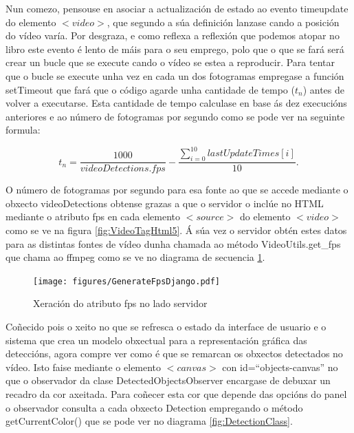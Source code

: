         Nun comezo, pensouse en asociar a actualización de estado ao evento timeupdate do elemento 
        $<video>$, que segundo a súa definición lanzase cando a posición do vídeo varía. Por desgraza, 
        e como reflexa a reflexión que podemos atopar no libro \cite[Capítulo 6.1]{video-con-html5}
        este evento é lento de máis para o seu emprego, polo que o que se fará será
        crear un bucle que se execute cando o vídeo se estea a reproducir. Para tentar que o bucle se 
        execute unha vez en cada un dos fotogramas empregase a función setTimeout que fará que o 
        código agarde unha cantidade de tempo ($t_n$) antes de volver a executarse. Esta cantidade de tempo 
        calculase en base ás dez execucións anteriores e ao número de fotogramas por segundo como se
        pode ver na seguinte formula:
        
        \begin{equation}
         t_n = \dfrac{1000}{videoDetections.fps} - \dfrac{\sum_{i=0}^{10} lastUpdateTimes[i]}{10}.
        \end{equation}

        O número de fotogramas por segundo para esa fonte ao que se accede mediante o obxecto 
        videoDetections obtense grazas a que o servidor o inclúe no HTML mediante o atributo fps en 
        cada elemento $<source>$ do elemento $<video>$ como se ve na figura \ref{fig:VideoTagHtml5}.
        Á súa vez o servidor obtén estes datos para as distintas fontes de vídeo dunha chamada ao
        método VideoUtils.get\_fps que chama ao ffmpeg como se ve no diagrama de secuencia 
        \ref{fig:GenerateFpsDjango}.
        
        \begin{figure}[htp]
        \begin{center}
            \texttt{[image: figures/GenerateFpsDjango.pdf]}
            \caption{Xeración do atributo fps no lado servidor}
        \label{fig:GenerateFpsDjango}
        \end{center}
        \end{figure}
                
        Coñecido pois o xeito no que se refresca o estado da interface de usuario e o sistema que crea un 
        modelo obxectual para a representación gráfica das deteccións, agora compre ver como é que se 
        remarcan os obxectos detectados no vídeo. Isto faise mediante o elemento $<canvas>$ con
        id=``objects-canvas'' no que o observador da clase DetectedObjectsObserver encargase de debuxar
        un recadro da cor axeitada. Para coñecer esta cor que depende das opcións do panel o observador
        consulta a cada obxecto Detection empregando o método getCurrentColor() que se pode ver no 
        diagrama \ref{fig:DetectionClass}.

